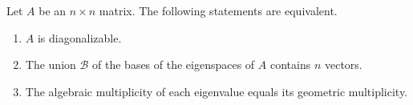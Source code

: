 \documentclass[../m073main.tex]{subfiles}
\begin{document}
\begin{theorem}
	Let $A$ be an $n \times n$ matrix.
	The following statements are equivalent.
	\begin{enumerate}[label=(\alph*)]
		\item $A$ is diagonalizable.
		\item The union $\mathcal{B}$ of the bases of the eigenspaces of $A$ contains $n$ vectors.
		\item The algebraic multiplicity of each eigenvalue equals its geometric multiplicity.
	\end{enumerate}
\end{theorem}
\end{document}
